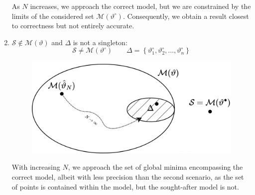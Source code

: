 \begin{enumerate}
\begin{figure}[H]
        \end{figure}
        As $N$ increases, we approach the correct model, but we are constrained by the limits of the considered set $\mathcal{M}(\vartheta^\circ)$. 
        Consequently, we obtain a result closest to correctness but not entirely accurate.
    \item $\mathcal{S} \notin \mathcal{M}(\vartheta)$ and $\Delta$ is not a singleton: 
        \[\mathcal{S}\neq\mathcal{M}(\vartheta^\circ)  \qquad \Delta=\left\{ \vartheta^\circ_1,\vartheta^\circ_2,\dots,\vartheta^\circ_n \right\}\]
        \begin{figure}[H]
            \centering
            \includegraphics[width=0.55\linewidth]{images/four.png}
        \end{figure}
        With increasing $N$, we approach the set of global minima encompassing the correct model, albeit with less precision than the second scenario, as the set of points is contained within the model, but the sought-after model is not.
\end{enumerate}